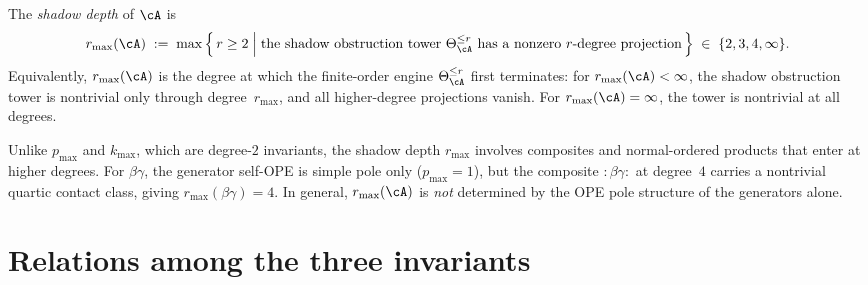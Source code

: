 \begin{definition}
\label{def:r-max}
The \emph{shadow depth} of $\cA$ is
\begin{equation}\label{eq:r-max-def}
r_{\max}(\cA)
\;:=\;
\max\Big\{\,r \geq 2
\;\Big|\;
\text{the shadow obstruction tower }\Theta_\cA^{\leq r}
\text{ has a nonzero~$r$-degree projection}\,\Big\}
\;\in\;\{2, 3, 4, \infty\}.
\end{equation}
Equivalently, $r_{\max}(\cA)$ is the degree at which the finite-order
engine $\Theta_\cA^{\leq r}$ first terminates: for $r_{\max}(\cA)<\infty$,
the shadow obstruction tower is nontrivial only through
degree~$r_{\max}$, and all higher-degree projections vanish.
For $r_{\max}(\cA) = \infty$, the tower is nontrivial at all degrees.
\end{definition}

\begin{remark}
\label{rem:r-max-all-degrees}
Unlike $p_{\max}$ and $k_{\max}$, which are degree-$2$ invariants,
the shadow depth $r_{\max}$ involves composites and normal-ordered
products that enter at higher degrees. For $\beta\gamma$, the
generator self-OPE is simple pole only
\textup{(}$p_{\max}=1$\textup{)}, but the composite $:\!\beta\gamma\!:$
at degree~$4$ carries a nontrivial quartic contact class,
giving $r_{\max}(\beta\gamma) = 4$. In general,
$r_{\max}(\cA)$ is \emph{not} determined by the OPE pole structure
of the generators alone.
\end{remark}

\section{Relations among the three invariants}
\label{sec:three-invariants-relations}

